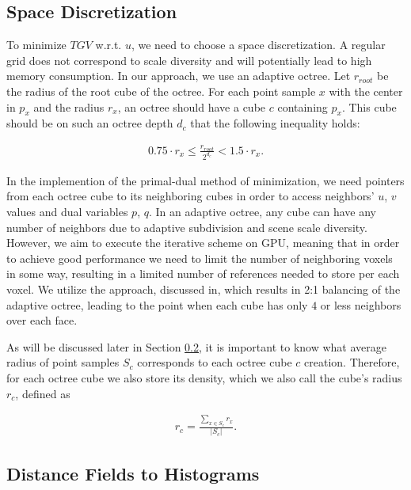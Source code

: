 \documentclass[10pt,twocolumn,letterpaper]{article}
\begin{document}
\subsection{Space Discretization}
\label{sec:space-repr}

To minimize $TGV$ w.r.t. $u$, we need to choose a space discretization. A regular grid \cite{zach2007globally} does not correspond to scale diversity and will potentially lead to high memory consumption. In our approach, we use an adaptive octree.
Let $r_{root}$ be the radius of the root cube of the octree.
For each point sample $x$ with the center in $p_x$ and the radius $r_x$, an octree should have
a cube $c$ containing $p_x$. This cube should be on such an octree depth $d_c$ that the following inequality holds:

\begin{align}
    0.75 \cdot r_x \le \frac{r_{root}}{2^{d_c}} < 1.5 \cdot r_x.
    \label{fig:cube_depth}
\end{align}

In the implemention of the primal-dual method of minimization, we need pointers from each octree cube to its
neighboring cubes in order to access neighbors' $u$, $v$ values and dual variables $p$, $q$. In an adaptive octree, any cube can have any number of neighbors
due to adaptive subdivision and scene scale diversity. However, we aim to execute the iterative scheme on GPU, meaning that in order
to achieve good performance we need to limit the number of neighboring voxels in some way, resulting in a limited number of references needed to store per each voxel.
We utilize the approach, discussed in\cite{ummenhofer2015global}, which results in 2:1 balancing of the adaptive octree, leading to the point when each cube has only $4$ or less neighbors over each face.

As will be discussed later in Section \ref{sec:dist-fields}, it is important to know what average radius of point samples $S_c$ corresponds to each octree cube $c$ creation. Therefore,
for each octree cube we also store its density, which we also call the cube's radius $r_c$, defined as

\begin{align}
    r_c = \frac{ \sum_{x \in S_c} r_x}{| S_c |}.
    \label{fig:cube_radius}
\end{align}


\subsection{Distance Fields to Histograms}
\label{sec:dist-fields}
\end{document}
